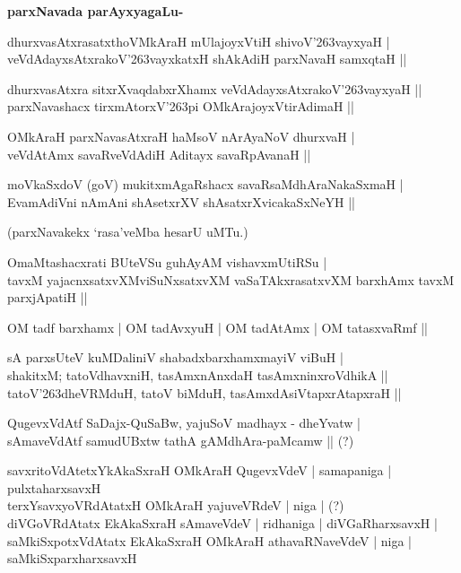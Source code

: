 {\bigskip
\noindent
{\large\bf parxNavada parAyxyagaLu-}}
\begin{itemize}
{\bf 
\item[1.] dhurxvasAtxrasatxthoVMkAraH mUlajoyxVtiH shivoV\char'263vayxyaH |\\\label{155}
veVdAdayxsAtxrakoV\char'263vayxkatxH shAkAdiH parxNavaH samxqtaH ||
\item[2.] dhurxvasAtxra sitxrXvaqdabxrXhamx veVdAdayxsAtxrakoV\char'263vayxyaH ||\\\label{155}
parxNavashacx tirxmAtorxV\char'263pi OMkArajoyxVtirAdimaH ||
\item[3.] OMkAraH parxNavasAtxraH haMsoV nArAyaNoV dhurxvaH |\\\label{155}
veVdAtAmx savaRveVdAdiH Aditayx savaRpAvanaH ||
\item[4.] moVkaSxdoV (goV) mukitxmAgaRshacx savaRsaMdhAraNakaSxmaH |\\
EvamAdiVni nAmAni shAsetxrXV shAsatxrXvicakaSxNeYH ||}
\end{itemize}
(parxNavakekx `rasa'veMba hesarU uMTu.)
\begin{itemize}
{\bf 
\item[5.] OmaMtashacxrati BUteVSu guhAyAM vishavxmUtiRSu |\\\label{156}
tavxM yajacnxsatxvXMviSuNxsatxvXM vaSaTAkxrasatxvXM barxhAmx tavxM parxjApatiH ||
\item[6.] OM tadf barxhamx | OM tadAvxyuH | OM tadAtAmx | OM tatasxvaRmf ||\label{156}
\item[7.] sA parxsUteV kuMDaliniV shabadxbarxhamxmayiV viBuH |\\
shakitxM; tatoVdhavxniH, tasAmxnAnxdaH tasAmxninxroVdhikA ||\\
tatoV\char'263dheVRMduH, tatoV biMduH, tasAmxdAsiVtapxrAtapxraH ||
\item[8.] QugevxVdAtf SaDajx-QuSaBw, yajuSoV madhayx - dheYvatw |\\\label{156}
sAmaveVdAtf samudUBxtw tathA gAMdhAra-paMcamw || (?)
\item[9.] savxritoVdAtetxYkAkaSxraH\label{156} OMkAraH QugevxVdeV | samapaniga | pulxtaharxsavxH \\
terxYsavxyoVRdAtatxH OMkAraH yajuveVRdeV | niga | (?)\\
diVGoVRdAtatx EkAkaSxraH sAmaveVdeV | ridhaniga | diVGaRharxsavxH |\\
saMkiSxpotxVdAtatx EkAkaSxraH OMkAraH athavaRNaveVdeV | niga |\\
saMkiSxparxharxsavxH}
\end{itemize}

